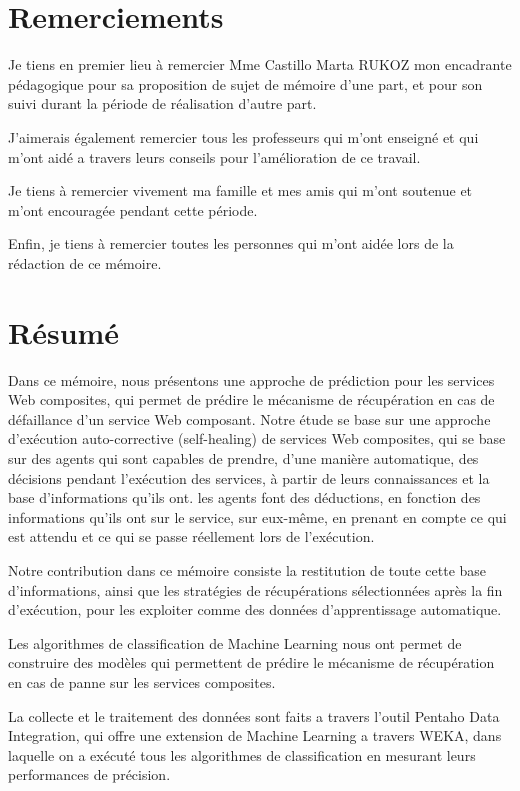 \documentclass[a4paper,12pt]{book}
\theoremstyle{break}
\begin{document}
\chapter*{Remerciements}

Je tiens en premier lieu à remercier Mme Castillo Marta RUKOZ mon encadrante pédagogique pour sa proposition de sujet de mémoire d'une part, et pour son suivi durant la période de réalisation d'autre part.

J'aimerais également remercier tous les professeurs qui m'ont enseigné et qui m'ont aidé a travers leurs conseils pour l'amélioration de ce travail.

Je tiens à remercier vivement ma famille et mes amis qui m’ont soutenue et m’ont encouragée pendant cette période.

Enfin, je tiens à remercier toutes les personnes qui m’ont aidée lors de la rédaction de ce mémoire. 


\chapter*{Résumé}

Dans ce mémoire, nous présentons une approche de prédiction pour les services Web composites,
qui permet de prédire le mécanisme de récupération en cas de défaillance d'un service Web composant.
Notre étude se base sur une approche d'exécution auto-corrective (self-healing) de services Web composites, qui se base sur des agents qui sont capables de prendre, d'une manière automatique, des décisions pendant l'exécution des services, à partir de leurs connaissances et la base d'informations qu'ils ont.
les agents font des déductions, en fonction des informations qu'ils ont sur le service, sur eux-même, en prenant en compte ce qui est attendu et ce qui se passe réellement lors de l'exécution.

Notre contribution dans ce mémoire consiste la restitution de toute cette base d'informations, ainsi que les stratégies de récupérations sélectionnées après la fin d'exécution, pour les exploiter comme des données  d'apprentissage automatique. 

Les algorithmes de classification de Machine Learning nous ont permet de construire des modèles qui permettent de prédire le mécanisme de récupération en cas de panne sur les services composites.

La collecte et le traitement des données sont faits a travers l'outil Pentaho Data Integration, qui offre une extension de Machine Learning a travers WEKA, dans laquelle on a exécuté tous les algorithmes de classification en mesurant leurs performances de précision.
\end{document}
